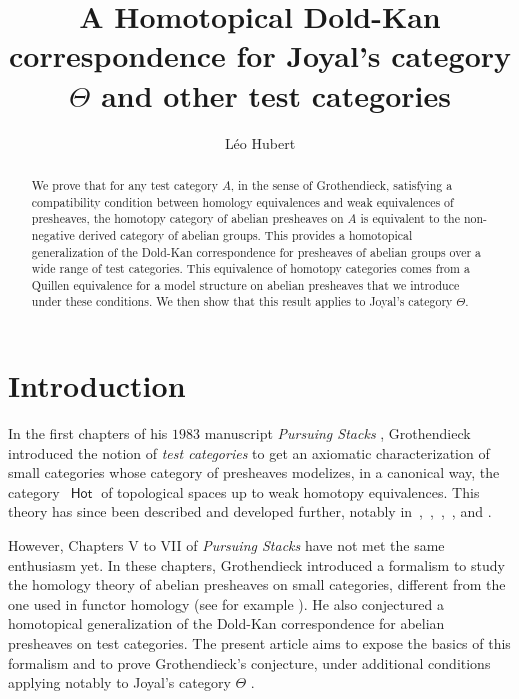 \documentclass[10pt, english, a4paper, nothms]{amsart}
\title[A Homotopical Dold-Kan correspondence for $\Theta$ and other test
categories]{%
A Homotopical Dold-Kan correspondence for Joyal's category $\Theta$ and other test categories
}
\author{Léo Hubert}
\theoremstyle{plain}
\theoremstyle{remark}
\theoremstyle{definition}
\numberwithin{equation}{theorem}
\newcommand{\Hot}{\operatorname{\mathsf{Hot}}}
\begin{document}
\begin{abstract}
We prove that for any test category $A$, in the sense of Grothendieck,
satisfying a compatibility condition between homology equivalences and weak
equivalences of presheaves, the homotopy category of abelian presheaves on $A$
is equivalent to the non-negative derived category of abelian groups. This
provides a homotopical generalization of the Dold-Kan correspondence for
presheaves of abelian groups over a wide range of test categories.
This equivalence of homotopy categories comes from a Quillen equivalence for a
model structure on abelian presheaves that we introduce under these conditions.
We then show that this result applies to Joyal's category $\Theta$.
\end{abstract}

\maketitle

\section*{Introduction}
In the first chapters of his $1983$ manuscript \emph{Pursuing Stacks}
\cite{pursuingstacks}, Grothendieck introduced the notion of \emph{test
categories} to get an axiomatic characterization of small categories whose
category of presheaves modelizes, in a canonical way, the category~$\Hot$ of
topological spaces up to weak homotopy equivalences. This theory has since been
described and developed further, notably
in~\cite{maltsiniotis2005},~\cite{cisinskipref},~\cite{jardine2006categorical},~\cite{cisinski2011theta},
\cite{ara2019DendroidalTest} and \cite{ara2012thetatest}. 

However, Chapters V to VII of \emph{Pursuing Stacks} have not met the same
enthusiasm yet. In these chapters, Grothendieck introduced a formalism to study
the homology theory of abelian presheaves on small categories, different from
the one used in functor homology (see for example
\cite{pirashvili2003introduction}). He also conjectured a homotopical
generalization of the Dold-Kan correspondence for abelian presheaves on test
categories. The present article aims to expose the basics of this formalism and
to prove Grothendieck's conjecture, under additional conditions applying notably
to Joyal's category $\Theta$ \cite{joyal1997disks}.
\end{document}
